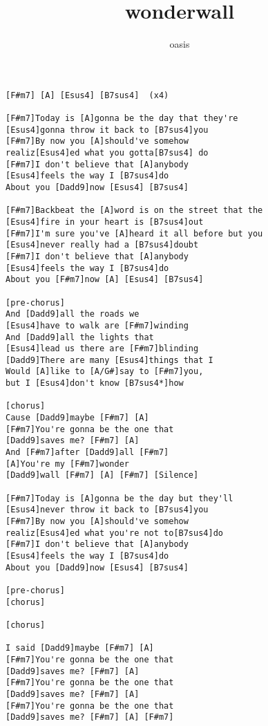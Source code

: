 \author{oasis}
\title{wonderwall}
\maketitle
\begin{verbatim}
[F#m7] [A] [Esus4] [B7sus4]  (x4)

[F#m7]Today is [A]gonna be the day that they're 
[Esus4]gonna throw it back to [B7sus4]you
[F#m7]By now you [A]should've somehow 
realiz[Esus4]ed what you gotta[B7sus4] do
[F#m7]I don't believe that [A]anybody 
[Esus4]feels the way I [B7sus4]do 
About you [Dadd9]now [Esus4] [B7sus4]

[F#m7]Backbeat the [A]word is on the street that the 
[Esus4]fire in your heart is [B7sus4]out
[F#m7]I'm sure you've [A]heard it all before but you 
[Esus4]never really had a [B7sus4]doubt
[F#m7]I don't believe that [A]anybody 
[Esus4]feels the way I [B7sus4]do
About you [F#m7]now [A] [Esus4] [B7sus4]

[pre-chorus]
And [Dadd9]all the roads we 
[Esus4]have to walk are [F#m7]winding
And [Dadd9]all the lights that 
[Esus4]lead us there are [F#m7]blinding
[Dadd9]There are many [Esus4]things that I 
Would [A]like to [A/G#]say to [F#m7]you, 
but I [Esus4]don't know [B7sus4*]how

[chorus]
Cause [Dadd9]maybe [F#m7] [A]
[F#m7]You're gonna be the one that 
[Dadd9]saves me? [F#m7] [A]
And [F#m7]after [Dadd9]all [F#m7]
[A]You're my [F#m7]wonder
[Dadd9]wall [F#m7] [A] [F#m7] [Silence]

[F#m7]Today is [A]gonna be the day but they'll 
[Esus4]never throw it back to [B7sus4]you
[F#m7]By now you [A]should've somehow 
realiz[Esus4]ed what you're not to[B7sus4]do
[F#m7]I don't believe that [A]anybody 
[Esus4]feels the way I [B7sus4]do 
About you [Dadd9]now [Esus4] [B7sus4]

[pre-chorus]
[chorus]

[chorus]

I said [Dadd9]maybe [F#m7] [A]
[F#m7]You're gonna be the one that 
[Dadd9]saves me? [F#m7] [A]
[F#m7]You're gonna be the one that 
[Dadd9]saves me? [F#m7] [A]
[F#m7]You're gonna be the one that 
[Dadd9]saves me? [F#m7] [A] [F#m7]
\end{verbatim}